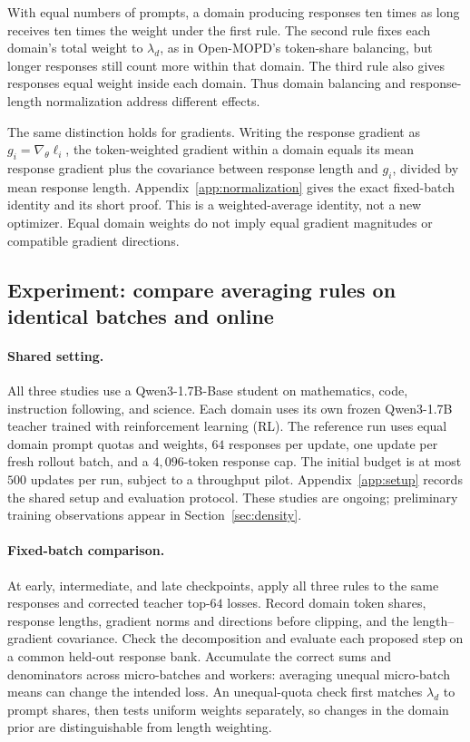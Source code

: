 With equal numbers of prompts, a domain producing responses ten times
as long receives ten times the weight under the first rule. The second
rule fixes each domain's total weight to $\lambda_d$, as in Open-MOPD's
token-share balancing, but longer responses still count more within
that domain. The third rule also gives responses equal weight inside
each domain. Thus domain balancing and response-length normalization
address different effects.

The same distinction holds for gradients. Writing the response gradient
as $g_i=\nabla_\theta\ell_i$, the token-weighted gradient within a domain
equals its mean response gradient plus the covariance between response
length and $g_i$, divided by mean response length.
Appendix~\ref{app:normalization} gives the exact fixed-batch identity
and its short proof. This is a weighted-average identity, not a new
optimizer. Equal domain weights do not imply equal gradient magnitudes
or compatible gradient directions.

\subsection{Experiment: compare averaging rules on identical batches and online}

\paragraph{Shared setting.}
All three studies use a Qwen3-1.7B-Base student on mathematics, code,
instruction following, and science. Each domain uses its own
frozen Qwen3-1.7B teacher trained with reinforcement learning (RL).
The reference run uses equal domain prompt quotas
and weights, $64$ responses per update, one update per fresh rollout
batch, and a $4{,}096$-token response cap. The initial budget is at most
$500$ updates per run, subject to a throughput pilot.
Appendix~\ref{app:setup} records the shared setup and evaluation protocol.
These studies are ongoing; preliminary training observations appear in
Section~\ref{sec:density}.

\paragraph{Fixed-batch comparison.}
At early, intermediate, and late checkpoints, apply all three rules to
the same responses and corrected teacher top-$64$ losses. Record domain
token shares, response lengths, gradient norms and directions before
clipping, and the length--gradient covariance. Check the decomposition
and evaluate each proposed step on a common held-out response bank.
Accumulate the correct sums and denominators across micro-batches and
workers: averaging unequal micro-batch means can change the intended
loss. An unequal-quota check first matches $\lambda_d$ to prompt shares,
then tests uniform weights separately, so changes in the domain prior
are distinguishable from length weighting.

